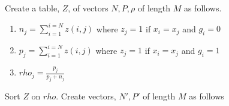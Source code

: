 Create a table, \(Z\), of vectors \(N, P, \rho\) of length \(M\) as follows.  
\begin{enumerate}
\item 
\(n_j = \sum_{i=1}^{i=N} z(i, j)\) where 
\(z_j = 1 \) if \(x_i = x_j \) and \(g_i = 0\)
\item 
\(p_j = \sum_{i=1}^{i=N} z(i, j)\) where 
\(z_j = 1 \) if \(x_i = x_j \) and \(g_i = 1\)
\item 
\(rho_j = \frac{p_j}{p_j+n_j}\)
\end{enumerate}
Sort \(Z\) on \(rho\). Create vectors, \(N', P'\) of length \(M\) as follows
\be
\item 
\ee







